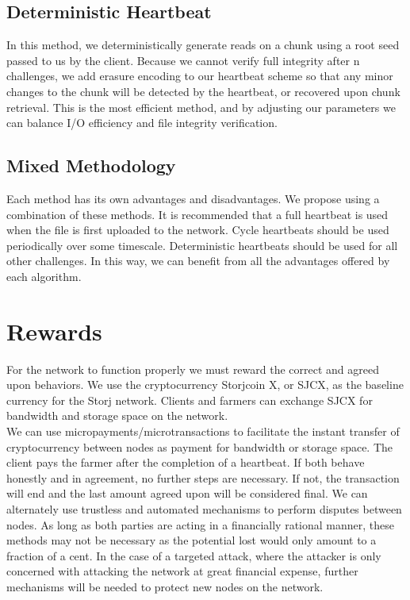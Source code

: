 \documentclass[a4paper,10pt]{article}
\begin{document}
\subsection{Deterministic Heartbeat}
In this method, we deterministically generate reads on a chunk using a root seed passed to us by the client. Because we cannot verify full integrity after n challenges, we add erasure encoding to our heartbeat scheme so that any minor changes to the chunk will be detected by the heartbeat, or recovered upon chunk retrieval. This is the most efficient method, and by adjusting our parameters we can balance I/O efficiency and file integrity verification.  
\subsection{Mixed Methodology}
Each method has its own advantages and disadvantages. We propose using a combination of these methods. It is recommended that a full heartbeat is used when the file is first uploaded to the network. Cycle heartbeats should be used periodically over some timescale. Deterministic heartbeats should be used for all other challenges. In this way, we can benefit from all the advantages offered by each algorithm. 


\section{Rewards}
For the network to function properly we must reward the correct and agreed upon behaviors. We use the cryptocurrency Storjcoin X, or SJCX, as the baseline currency for the Storj network. Clients and farmers can exchange SJCX for bandwidth and storage space on the network.\\

We can use micropayments/microtransactions \cite{12} \cite{13} to facilitate the instant transfer of cryptocurrency between nodes as payment for bandwidth or storage space. The client pays the farmer after the completion of a heartbeat. If both behave honestly and in agreement, no further steps are necessary. If not, the transaction will end and the last amount agreed upon will be considered final. We can alternately use trustless and automated mechanisms to perform disputes between nodes. As long as both parties are acting in a financially rational manner, these methods may not be necessary as the potential lost would only amount to a fraction of a cent. In the case of a targeted attack, where the attacker is only concerned with attacking the network at great financial expense, further mechanisms will be needed to protect new nodes on the network. 
\end{document}

